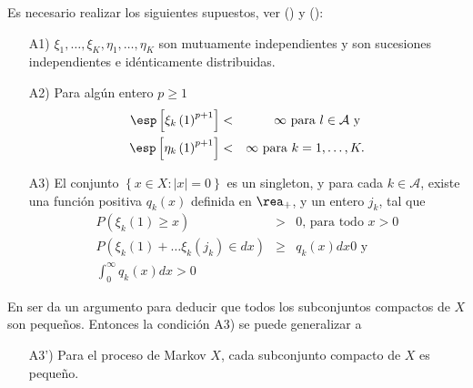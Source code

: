 Es necesario realizar los siguientes supuestos, ver (\cite{Dai2}) y (\cite{DaiSean}):

\begin{itemize}
\item[A1)] $\xi_{1},\ldots,\xi_{K},\eta_{1},\ldots,\eta_{K}$ son
mutuamente independientes y son sucesiones independientes e
id\'enticamente distribuidas.

\item[A2)] Para alg\'un entero $p\geq1$
\begin{eqnarray*}
\esp\left[\xi_{k}\left(1\right)^{p+1}\right]&<&\infty\textrm{ para }l\in\mathcal{A}\textrm{ y }\\
\esp\left[\eta_{k}\left(1\right)^{p+1}\right]&<&\infty\textrm{ para
}k=1,\ldots,K.
\end{eqnarray*}
\item[A3)] El conjunto $\left\{x\in X:|x|=0\right\}$ es un
singleton, y para cada $k\in\mathcal{A}$, existe una funci\'on
positiva $q_{k}\left(x\right)$ definida en $\rea_{+}$, y un entero
$j_{k}$, tal que
\begin{eqnarray}
P\left(\xi_{k}\left(1\right)\geq x\right)&>&0\textrm{, para todo }x>0\\
P\left(\xi_{k}\left(1\right)+\ldots\xi_{k}\left(j_{k}\right)\in dx\right)&\geq& q_{k}\left(x\right)dx0\textrm{ y }\\
\int_{0}^{\infty}q_{k}\left(x\right)dx>0
\end{eqnarray}
\end{itemize}


En \cite{MaynDown} ser da un argumento para deducir que todos los
subconjuntos compactos de $X$ son peque\~nos. Entonces la
condici\'on A3) se puede generalizar a
\begin{itemize}
\item[A3')] Para el proceso de Markov $X$, cada subconjunto
compacto de $X$ es peque\~no.
\end{itemize}


